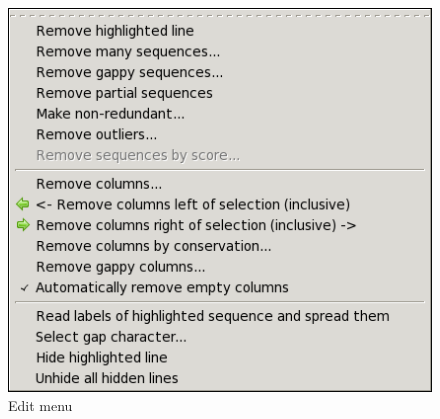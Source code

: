 \documentclass[letterpaper]{article}
\begin{document}
\begin{figure}[htb]
\centering
\color{lightblue}
\includegraphics[width=11.6cm]{img_menu_edit.png}
\caption{Edit menu}
\label{fig:edit_menu}
\end{figure}
\end{document}
